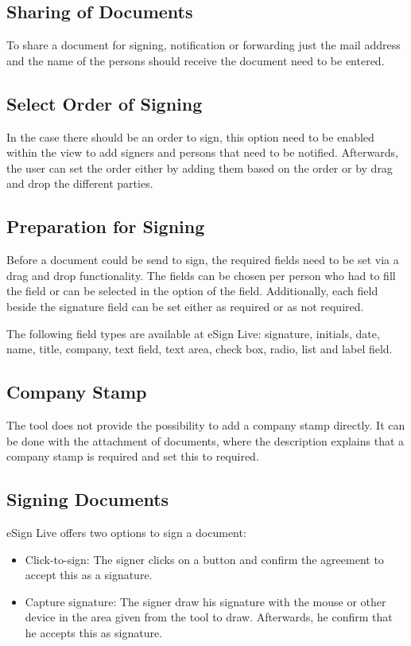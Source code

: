 \subsection{Sharing of Documents}
To share a document for signing, notification or forwarding just the mail address and the name of the persons should receive the document need to be entered.

\subsection{Select Order of Signing}
In the case there should be an order to sign, this option need to be enabled within the view to add signers and persons that need to be notified. Afterwards, the user can set the order either by adding them based on the order or by drag and drop the different parties.

\subsection{Preparation for Signing}
Before a document could be send to sign, the required fields need to be set via a drag and drop functionality. The fields can be chosen per person who had to fill the field or can be selected in the option of the field. Additionally, each field beside the signature field can be set either as required or as not required.

The following field types are available at eSign Live: signature, initials, date, name, title, company, text field, text area, check box, radio, list and label field.

\subsection{Company Stamp}
The tool does not provide the possibility to add a company stamp directly. It can be done with the attachment of documents, where the description explains that a company stamp is required and set this to required.

\subsection{Signing Documents}
eSign Live offers two options to sign a document:
\begin{itemize}
	\item Click-to-sign: The signer clicks on a button and confirm the agreement to accept this as a signature.
	\item  Capture signature: The signer draw his signature with the mouse or other device in  the area given from the tool to draw. Afterwards, he confirm that he accepts this as signature.
\end{itemize}

